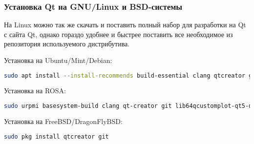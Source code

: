 \subsubsection{Установка Qt на GNU/Linux и BSD-системы}
На Linux можно так же скачать и поставить полный набор для разработки на Qt с сайта Qt, однако гораздо удобнее и быстрее поставить все необходимое из репозитория используемого дистрибутива.

Установка на Ubuntu/Mint/Debian:
\begin{lstlisting}[language=bash]
sudo apt install --install-recommends build-essential clang qtcreator git libqcustomplot-dev
\end{lstlisting}

Установка на ROSA:
\begin{lstlisting}[language=bash]
sudo urpmi basesystem-build clang qt-creator git lib64qcustomplot-qt5-devel
\end{lstlisting}

Установка на FreeBSD/DragonFlyBSD:
\begin{lstlisting}[language=bash]
sudo pkg install qtcreator git
\end{lstlisting}

\clearpage
